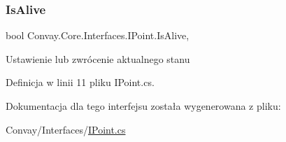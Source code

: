 \subsubsection{\texorpdfstring{Is\+Alive}{IsAlive}}
{\footnotesize\ttfamily bool Convay.\+Core.\+Interfaces.\+I\+Point.\+Is\+Alive\hspace{0.3cm}{\ttfamily [get]}, {\ttfamily [set]}}



Ustawienie lub zwrócenie aktualnego stanu 



Definicja w linii 11 pliku I\+Point.\+cs.



Dokumentacja dla tego interfejsu została wygenerowana z pliku\+:\begin{DoxyCompactItemize}
\item 
Convay/\+Interfaces/\hyperlink{_i_point_8cs}{I\+Point.\+cs}\end{DoxyCompactItemize}
